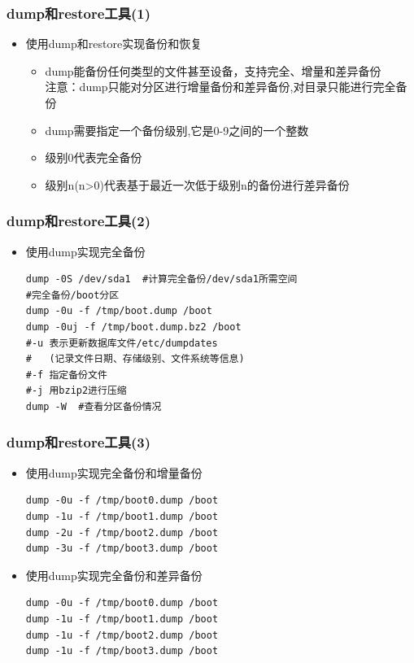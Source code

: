 \documentclass[xcolor=svgnames,presentation]{beamer}
\begin{document}
\begin{frame}
\frametitle{dump和restore工具(1)}
\label{sec-7-6}
\begin{itemize}

\item 使用dump和restore实现备份和恢复
\label{sec-7-6-1}%
\begin{itemize}

\item dump能备份任何类型的文件甚至设备，支持完全、增量和差异备份\\
\label{sec-7-6-1-1}%
注意：dump只能对分区进行增量备份和差异备份,对目录只能进行完全备份

\item dump需要指定一个备份级别,它是0-9之间的一个整数
\label{sec-7-6-1-2}%

\item 级别0代表完全备份
\label{sec-7-6-1-3}%

\item 级别n(n>0)代表基于最近一次低于级别n的备份进行差异备份
\label{sec-7-6-1-4}%
\end{itemize} %
\end{itemize} %
\end{frame}
\begin{frame}[fragile]
\frametitle{dump和restore工具(2)}
\label{sec-7-7}
\begin{itemize}

\item 使用dump实现完全备份\\
\label{sec-7-7-1}%
\begin{verbatim}
dump -0S /dev/sda1  #计算完全备份/dev/sda1所需空间
#完全备份/boot分区
dump -0u -f /tmp/boot.dump /boot
dump -0uj -f /tmp/boot.dump.bz2 /boot
#-u 表示更新数据库文件/etc/dumpdates
#   (记录文件日期、存储级别、文件系统等信息)
#-f 指定备份文件
#-j 用bzip2进行压缩
dump -W  #查看分区备份情况
\end{verbatim}
\end{itemize} %
\end{frame}
\begin{frame}[fragile]
\frametitle{dump和restore工具(3)}
\label{sec-7-8}
\begin{itemize}

\item 使用dump实现完全备份和增量备份\\
\label{sec-7-8-1}%
\begin{verbatim}
dump -0u -f /tmp/boot0.dump /boot
dump -1u -f /tmp/boot1.dump /boot
dump -2u -f /tmp/boot2.dump /boot
dump -3u -f /tmp/boot3.dump /boot
\end{verbatim}

\item 使用dump实现完全备份和差异备份\\
\label{sec-7-8-2}%
\begin{verbatim}
dump -0u -f /tmp/boot0.dump /boot
dump -1u -f /tmp/boot1.dump /boot
dump -1u -f /tmp/boot2.dump /boot
dump -1u -f /tmp/boot3.dump /boot
\end{verbatim}
\end{itemize} %
\end{frame}
\end{document}

